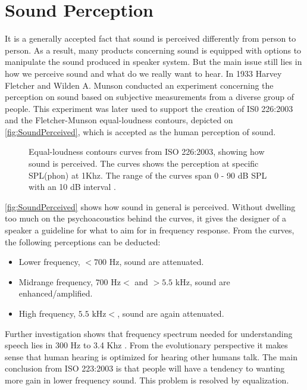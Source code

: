 \section{Sound Perception}

It is a generally accepted fact that sound is perceived differently from person to person. As a result, many products concerning sound is equipped with options to manipulate the sound produced in speaker system. But the main issue still lies in how we perceive sound and what do we really want to hear. In 1933 Harvey Fletcher and Wilden A. Munson conducted an experiment concerning the perception on sound based on subjective measurements from a diverse group of people. This experiment was later used to support the creation of IS0 226:2003 and the Fletcher-Munson equal-loudness contours, depicted on \autoref{fig:SoundPerceived}, which is accepted as the human perception of sound.

\begin{figure}[H]
\centering
{}

\caption{Equal-loudness contours curves from ISO 226:2003, showing how sound is perceived. The curves shows the perception at specific SPL(phon) at 1Khz. The range of the curves span 0 - 90 dB SPL with an 10 dB interval .}
\label{fig:SoundPerceived}
\end{figure}
\autoref{fig:SoundPerceived} shows how sound in general is perceived. Without dwelling too much on the psychoacoustics behind the curves, it gives the designer of a speaker a guideline for what to aim for in frequency response. From the curves, the following perceptions can be deducted:
\begin{itemize}
\item Lower frequency, $ < 700$ Hz, sound are attenuated.
\item Midrange frequency, $700 \text{ Hz} < $ and $ > 5.5$ kHz, sound are enhanced/amplified.
\item High frequency, $ 5.5 \text{ kHz} < $, sound are again attenuated.
\end{itemize}

Further investigation shows that frequency spectrum needed for understanding speech lies in 300 Hz to 3.4 Khz \citep{sou:VoiceFundamentals}. From the evolutionary perspective it makes sense that human hearing is optimized for hearing other humans talk. The main conclusion from ISO 223:2003 is that people will have a tendency to wanting more gain in lower frequency sound. This problem is resolved by equalization.

